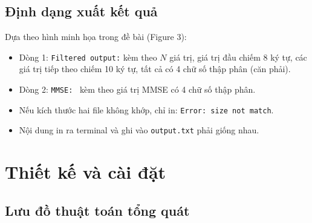 \documentclass[twoside,final]{hcmut-report}
\begin{document}
\subsection{Định dạng xuất kết quả}

Dựa theo hình minh họa trong đề bài (Figure 3):
\begin{itemize}
  \item Dòng 1: \texttt{Filtered output:} kèm theo $N$ giá trị, giá trị đầu
        chiếm 8 ký tự, các giá trị tiếp theo chiếm 10 ký tự, tất cả có
        4 chữ số thập phân (căn phải).
  \item Dòng 2: \texttt{MMSE: } kèm theo giá trị MMSE có 4 chữ số thập phân.
  \item Nếu kích thước hai file không khớp, chỉ in: \texttt{Error: size not match}.
  \item Nội dung in ra terminal và ghi vào \texttt{output.txt} phải giống nhau.
\end{itemize}

\section{Thiết kế và cài đặt}

\subsection{Lưu đồ thuật toán tổng quát}
\end{document}
